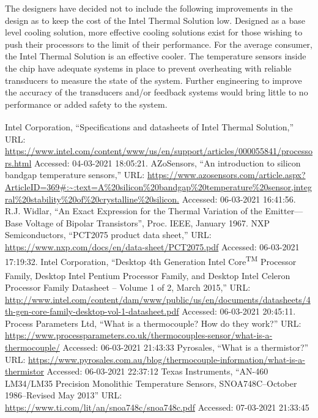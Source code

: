 \documentclass[conference]{IEEEtran}
\begin{document}
The designers have decided not to include the following improvements in the design as to keep the cost of the Intel Thermal Solution low. Designed as a base level cooling solution, more effective cooling solutions exist for those wishing to push their processors to the limit of their performance. For the average consumer, the Intel Thermal Solution is an effective cooler. The temperature sensors inside the chip have adequate systems in place to prevent overheating with reliable transducers to measure the state of the system. Further engineering to improve the accuracy of the transducers and/or feedback systems would bring little to no performance or added safety to the system. 
\begin{thebibliography}{00}
 Intel Corporation, ``Specifications and datasheets of Intel\textsuperscript{\tiny\textregistered} Thermal Solution,'' URL: \url{https://www.intel.com/content/www/us/en/support/articles/000055841/processors.html} Accessed: 04-03-2021 18:05:21.
 AZoSensors, ``An introduction to silicon bandgap temperature sensors,'' URL: \url{https://www.azosensors.com/article.aspx?ArticleID=369#:~:text=A%20silicon%20bandgap%20temperature%20sensor,integral%20stability%20of%20crystalline%20silicon.} Accessed: 06-03-2021 16:41:56.
 R.J. Widlar, “An Exact Expression for the Thermal Variation of the Emitter—Base Voltage of Bipolar Transistors”, Proc. IEEE, January 1967.
 NXP Semiconductors, ``PCT2075 product data sheet,'' URL: \url{https://www.nxp.com/docs/en/data-sheet/PCT2075.pdf} Accessed: 06-03-2021 17:19:32.
 Intel Corporation, ``Desktop 4th Generation Intel\textsuperscript{\tiny\textregistered} Core\textsuperscript{\tiny TM} Processor Family, Desktop Intel\textsuperscript{\tiny\textregistered} Pentium\textsuperscript{\tiny\textregistered} Processor Family, and Desktop Intel\textsuperscript{\tiny\textregistered} Celeron\textsuperscript{\tiny\textregistered} Processor Family Datasheet – Volume 1 of 2, March 2015,'' URL: \url{http://www.intel.com/content/dam/www/public/us/en/documents/datasheets/4th-gen-core-family-desktop-vol-1-datasheet.pdf} Accessed: 06-03-2021 20:45:11.
 Process Parameters Ltd, ``What is a thermocouple? How do they work?'' URL: \url{https://www.processparameters.co.uk/thermocouples-sensor/what-is-a-thermocouple/} Accessed: 06-03-2021 21:43:33
 Pyrosales, ``What is a thermistor?'' URL: \url{https://www.pyrosales.com.au/blog/thermocouple-information/what-is-a-thermistor} Accessed: 06-03-2021 22:37:12
 Texas Instruments, ``AN-460 LM34/LM35 Precision Monolithic Temperature Sensors, SNOA748C–October 1986–Revised May 2013'' URL: \url{https://www.ti.com/lit/an/snoa748c/snoa748c.pdf} Accessed: 07-03-2021 21:33:45

\end{thebibliography}
\end{document}
